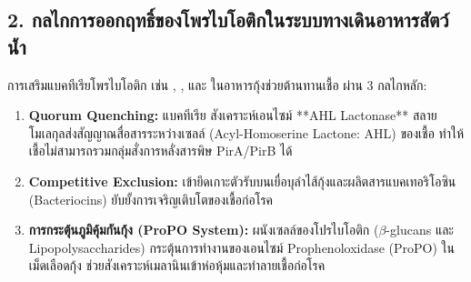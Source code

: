 \subsection{2. กลไกการออกฤทธิ์ของโพรไบโอติกในระบบทางเดินอาหารสัตว์น้ำ}
การเสริมแบคทีเรียโพรไบโอติก เช่น , , และ  ในอาหารกุ้งช่วยต้านทานเชื้อ  ผ่าน 3 กลไกหลัก:
\begin{enumerate}
    \item \textbf{Quorum Quenching:} แบคทีเรีย  สังเคราะห์เอนไซม์ **AHL Lactonase** สลายโมเลกุลส่งสัญญาณสื่อสารระหว่างเซลล์ (Acyl-Homoserine Lactone: AHL) ของเชื้อ  ทำให้เชื้อไม่สามารถรวมกลุ่มสั่งการหลั่งสารพิษ PirA/PirB ได้
    \item \textbf{Competitive Exclusion:} เข้ายึดเกาะตัวรับบนเยื่อบุลำไส้กุ้งและผลิตสารแบคเทอริโอซิน (Bacteriocins) ยับยั้งการเจริญเติบโตของเชื้อก่อโรค
    \item \textbf{การกระตุ้นภูมิคุ้มกันกุ้ง (ProPO System):} ผนังเซลล์ของโปรไบโอติก ($\beta$-glucans และ Lipopolysaccharides) กระตุ้นการทำงานของเอนไซม์ Prophenoloxidase (ProPO) ในเม็ดเลือดกุ้ง ช่วยสังเคราะห์เมลานินเข้าห่อหุ้มและทำลายเชื้อก่อโรค
\end{enumerate}

